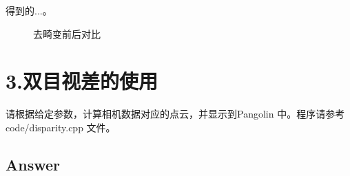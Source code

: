 \documentclass[
	12pt, %
]{fphw} %
\begin{document}
得到的...。
\begin{figure}[ht]
	\centering
	\hspace{0in}
	\caption{去畸变前后对比}
\end{figure}

\clearpage
\section*{3.双目视差的使用}

\begin{problem}
	请根据给定参数，计算相机数据对应的点云，并显示到Pangolin 中。程序请参考code/disparity.cpp 文件。
	
	\medskip
	
\end{problem}


\subsection*{Answer}
\end{document}
